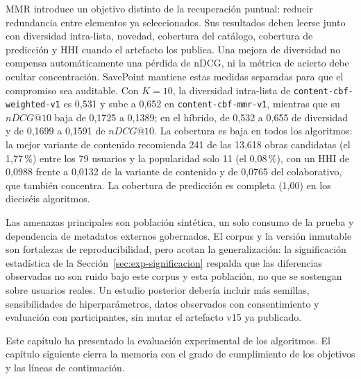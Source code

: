 MMR introduce un objetivo distinto de la recuperación puntual: reducir redundancia entre elementos ya seleccionados. Sus resultados deben leerse junto con diversidad intra-lista, novedad, cobertura del catálogo, cobertura de predicción y HHI cuando el artefacto los publica. Una mejora de diversidad no compensa automáticamente una pérdida de nDCG, ni la métrica de acierto debe ocultar concentración. SavePoint mantiene estas medidas separadas para que el compromiso sea auditable. Con \(K=10\), la diversidad intra-lista de \texttt{content-cbf-weighted-v1} es 0,531 y sube a 0,652 en \texttt{content-cbf-mmr-v1}, mientras que su \(nDCG@10\) baja de 0,1725 a 0,1389; en el híbrido, de 0,532 a 0,655 de diversidad y de 0,1699 a 0,1591 de \(nDCG@10\). La cobertura es baja en todos los algoritmos: la mejor variante de contenido recomienda 241 de las 13.618 obras candidatas (el 1,77\,\%) entre los 79 usuarios y la popularidad solo 11 (el 0,08\,\%), con un HHI de 0,0988 frente a 0,0132 de la variante de contenido y de 0,0765 del colaborativo, que también concentra. La cobertura de predicción es completa (1,00) en los dieciséis algoritmos.

Las amenazas principales son población sintética, un solo consumo de la prueba y dependencia de
metadatos externos gobernados. El corpus y la versión inmutable son fortalezas de reproducibilidad,
pero acotan la generalización: la significación estadística de la Sección~\ref{sec:exp-significacion}
respalda que las diferencias observadas no son ruido bajo este corpus y esta población, no
que se sostengan sobre usuarios reales. Un estudio posterior debería incluir más semillas,
sensibilidades de hiperparámetros, datos observados con consentimiento y evaluación con
participantes, sin mutar el artefacto v15 ya publicado.

Este capítulo ha presentado la evaluación experimental de los algoritmos. El capítulo siguiente
cierra la memoria con el grado de cumplimiento de los objetivos y las líneas de continuación.
